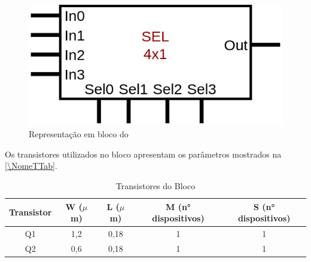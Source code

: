 \begin{figure}[htb]
    \centering
    \caption{\label{\NomeSFig}Representação em bloco do \NomeBloco}
    \includegraphics[scale=0.3]{Circuitos/sel4x1_block.png}
\end{figure}

Os transistores utilizados no bloco \NomeBloco{} apresentam os par\^ametros mostrados na \autoref{\NomeTTab}.

\begin{table}[htbp]
\caption{Transistores do Bloco \NomeBloco}
\label{\NomeTTab}
\centering
\begin{tabular}{ccccc}
\toprule
Transistor & W ($\mu$m)  & L ($\mu$m)           & M (n° dispositivos) & S (n° dispositivos)\\
\midrule \midrule
Q1 & 1,2 & 0,18 & 1 & 1\\
\midrule
Q2 & 0,6 & 0,18 & 1 & 1\\
\bottomrule
\end{tabular}
\end{table}